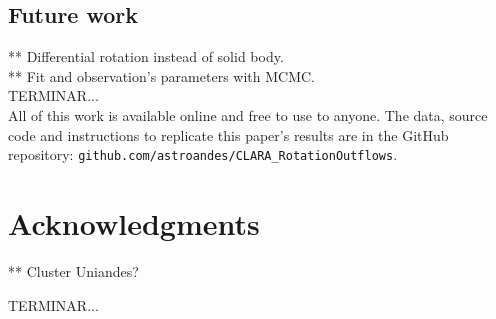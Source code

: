 \documentclass[twocolappendix]{latex/emulateapj}
\begin{document}
\subsection{Future work}

** Differential rotation instead of solid body. \\
** Fit and observation's parameters with MCMC. \\

TERMINAR...\\

All of this work is available online and free to use to anyone. The data, source code and instructions to replicate this paper's results are in the GitHub repository:  \texttt{github.com/astroandes/CLARA\_RotationOutflows}. \\


\section*{Acknowledgments}

** Cluster Uniandes? 

TERMINAR...\\





\end{document}
